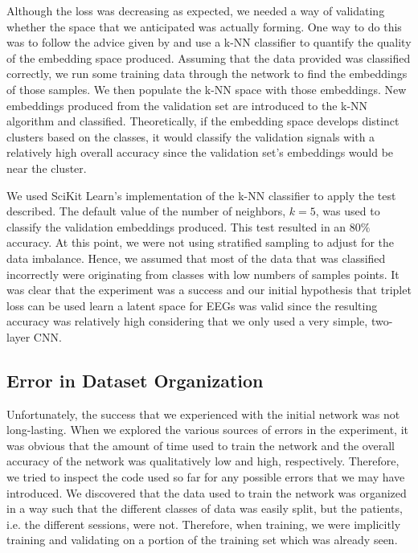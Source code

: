 Although the loss was decreasing as expected, we needed a way of validating whether the space that we anticipated was actually forming. One way to do this was to follow the advice given by \citet{facenet} and use a k-NN classifier to quantify the quality of the embedding space produced. Assuming that the data provided was classified correctly, we run some training data through the network to find the embeddings of those samples. We then populate the k-NN space with those embeddings. New embeddings produced from the validation set are introduced to the k-NN algorithm and classified. Theoretically, if the embedding space develops distinct clusters based on the classes, it would classify the validation signals with a relatively high overall accuracy since the validation set's embeddings would be near the cluster.  

We used SciKit Learn's implementation of the k-NN classifier to apply the test described. The default value of the number of neighbors, $k=5$, was used to classify the validation embeddings produced. This test resulted in an $80\%$ accuracy. At this point, we were not using stratified sampling to adjust for the data imbalance. Hence, we assumed that most of the data that was classified incorrectly were originating from classes with low numbers of samples points. It was clear that the experiment was a success and our initial hypothesis that triplet loss can be used learn a latent space for EEGs was valid since the resulting accuracy was relatively high considering that we only used a very simple, two-layer CNN.

\subsection{Error in Dataset Organization}

Unfortunately, the success that we experienced with the initial network was not long-lasting. When we explored the various sources of errors in the experiment, it was obvious that the amount of time used to train the network and the overall accuracy of the network was qualitatively low and high, respectively. Therefore, we tried to inspect the code used so far for any possible errors that we may have introduced. We discovered that the data used to train the network was organized in a way such that the different classes of data was easily split, but the patients, i.e. the different sessions, were not. Therefore, when training, we were implicitly training and validating on a portion of the training set which was already seen. 


